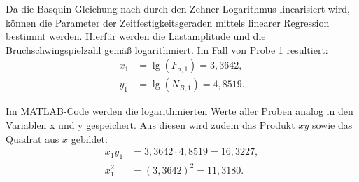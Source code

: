 	Da die Basquin-Gleichung nach  durch den Zehner-Logarithmus linearisiert wird, können die Parameter der Zeitfestigkeitsgeraden mittels linearer Regression bestimmt werden. Hierfür werden die Lastamplitude und die Bruchschwingspielzahl gemäß  logarithmiert. Im Fall von Probe 1 resultiert:
\begin{align*}
x_1 &= \lg(F_{a,1}) = 3{,}3642, \\
y_1 &= \lg(N_{B,1}) = 4{,}8519.
\end{align*}
	
	 Im MATLAB-Code werden die logarithmierten Werte aller Proben analog in den Variablen x und y gespeichert. Aus diesen wird zudem das Produkt $xy$ sowie das Quadrat aus $x$ gebildet:
\begin{align*}	 
x_1 y_1 &= 3{,}3642 \cdot 4{,}8519 = 16{,}3227, \\
x_1^2 &= (3{,}3642)^2 = 11{,}3180.
\end{align*}

